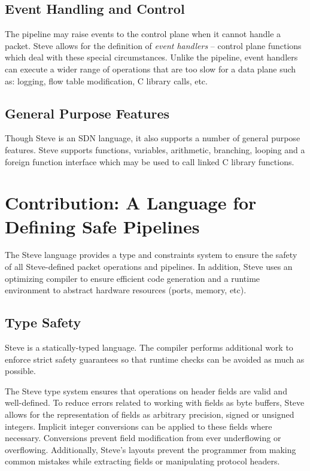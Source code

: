 \subsection{Event Handling and Control}

The pipeline may raise events to the control plane when
it cannot handle a packet. Steve allows for the definition of
\emph{event handlers} -- control plane functions which deal
with these special circumstances.
Unlike the pipeline, event handlers can execute a wider range of
operations that are too slow for a data plane such as:
logging, flow table modification, C library calls, etc.

\subsection{General Purpose Features}

Though Steve is an SDN language, it also supports a number of general purpose
features. 
Steve supports functions, variables, arithmetic, branching, 
looping and a foreign function interface which may be used to call linked C 
library functions.

\section{Contribution: A Language for Defining Safe Pipelines}

The Steve language provides a type and constraints system to ensure the safety
of all Steve-defined packet operations and pipelines.
In addition, Steve uses an optimizing compiler to ensure efficient code
generation
and a runtime environment to abstract hardware resources (ports, memory, etc).

\subsection{Type Safety}

Steve is a statically-typed language. The compiler performs additional work to
enforce strict safety guarantees so that runtime checks can be avoided as much
as possible.

The Steve type system ensures that operations on header fields are valid and
well-defined. 
To reduce errors related to working with fields as byte buffers, Steve allows
for the representation of fields as arbitrary precision, signed or unsigned
integers.
Implicit integer conversions can be applied to these fields where necessary.
Conversions prevent field modification from ever underflowing or overflowing.
Additionally, Steve's layouts prevent the programmer from making common mistakes while extracting fields or manipulating protocol headers. 

